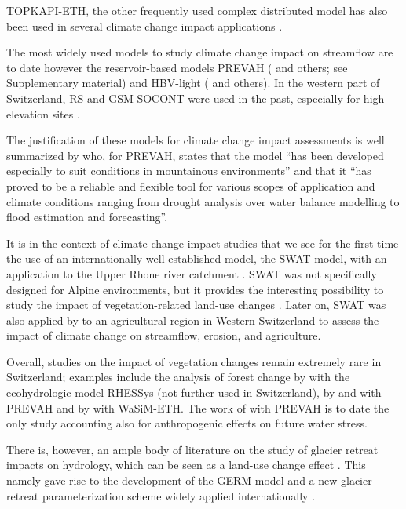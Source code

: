 \documentclass[10pt,a4paper]{article}
\begin{document}
TOPKAPI-ETH, the other frequently used complex distributed model has
also been used in several climate change impact
applications \citep{Fatichi2014,Fatichi2015,Finger_2012,Anghileri2018}. 

{The most widely used models to study climate change impact on
streamflow are to date however the reservoir-based models PREVAH
(}\citealt{Koplin2012,Bosshard2013a,Speich_2015,Junker_2014} and others; see Supplementary material) and
HBV-light (\citealt{Etter2017,Hakala2020,Brunner_2018,Jenicek2018} and others). In the western part of
Switzerland, RS and GSM-SOCONT were used in the past, especially for
high elevation sites \citep{Horton2006,Uhlmann_2012,Uhlmann2013a,Terrier2015}.

The justification of these models for climate change impact assessments
is well summarized by \citet{K_plin_2010} who, for PREVAH, states that
the model ``has been developed especially to suit conditions in
mountainous environments'' and that it ``has proved to be a reliable and
flexible tool for various scopes of application and climate conditions
ranging from drought analysis over water balance modelling to flood
estimation and forecasting''. 

It is in the context of climate change impact studies that we see for
the first time the use of an internationally well-established model, the
SWAT model, with an application to the Upper Rhone river
catchment \citep{Rahman2014}. SWAT was not specifically designed for
Alpine environments, but it provides the interesting possibility to
study the impact of vegetation-related land-use
changes \citep{Rahman2015}. Later on, SWAT was also applied
by \citet{Zarrineh2020} to an agricultural region in Western Switzerland
to assess the impact of climate change on streamflow, erosion, and
agriculture.

Overall, studies on the impact of vegetation changes remain extremely
rare in Switzerland; examples include the analysis of forest change
by \citet{zierl05} with the ecohydrologic model RHESSys (not further
used in Switzerland), by \citet{Koplin2013} and \citet{Schattan2013} with
PREVAH and by \citet{Alaoui2014} with WaSiM-ETH. The work
of \citet{Milano2015a} with PREVAH is to date the only study accounting
also for anthropogenic effects on future water stress. 

There is, however, an ample body of literature on the study of glacier
retreat impacts on hydrology, which can be seen as a land-use change
effect \citep{Horton2006,Schaefli2007b,Finger2015,Etter2017,Addor2014,Junghans2011}. 
This namely gave rise to the development of
the GERM model \citep{Huss2016,Junghans2011,Farinotti2012,Finger2013} 
and a new glacier retreat parameterization scheme widely applied
internationally \citep{Huss2010}.
\end{document}
